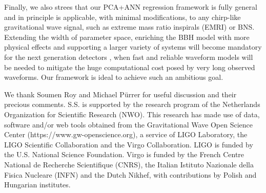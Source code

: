 \documentclass[twocolumn,showpacs,preprintnumbers,nofootinbib,prd,
superscriptaddress,10pt]{revtex4-2}
\begin{document}
Finally, we also strees that our PCA+ANN regression framework is fully general and in principle is applicable, with minimal modifications, to any chirp-like gravitational wave signal, such as extreme mass ratio inspirals (EMRI) \cite{Amaro-Seoane:2007osp, Amaro-Seoane:2012lgq} or BNS.
Extending the width of parameter space, enriching the BBH model with more physical effects and supporting a larger variety of systems will become mandatory for the next generation detectors \cite{Purrer:2019jcp, Owen:2023mid}, when fast and reliable waveform models will be needed to mitigate the huge computational cost posed by very long observed waveforms.
Our framework is ideal to achieve such an ambitious goal.



        \begin{acknowledgments}
          We thank Soumen Roy and Michael P{\"u}rrer for useful discussion and their precious comments.
          S.S. is supported by the research program of the Netherlands Organization for Scientific Research (NWO).
          This research has made use of data, software and/or web tools obtained 
          from the Gravitational Wave Open Science Center (https://www.gw-openscience.org), 
          a service of LIGO Laboratory, the LIGO Scientific Collaboration and the 
          Virgo Collaboration. LIGO is funded by the U.S. National Science Foundation. 
          Virgo is funded by the French Centre National de Recherche Scientifique (CNRS), 
          the Italian Istituto Nazionale della Fisica Nucleare (INFN) and the 
          Dutch Nikhef, with contributions by Polish and Hungarian institutes.
        \end{acknowledgments}

	

	
	
\end{document}
